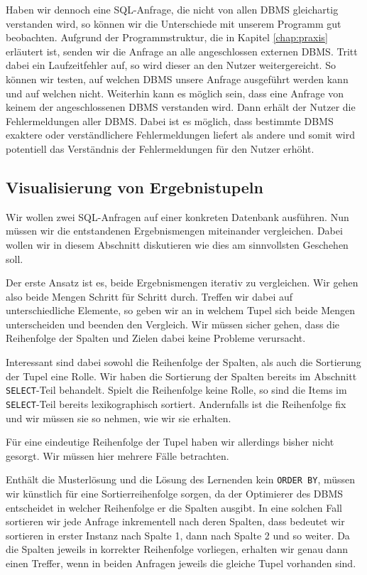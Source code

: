 Haben wir dennoch eine SQL-Anfrage, die nicht von allen DBMS gleichartig verstanden wird, so können wir die Unterschiede mit unserem Programm gut beobachten. Aufgrund der Programmstruktur, die in Kapitel \ref{chap:praxis} erläutert ist, senden wir die Anfrage an alle angeschlossen externen DBMS. Tritt dabei ein Laufzeitfehler auf, so wird dieser an den Nutzer weitergereicht. So können wir testen, auf welchen DBMS unsere Anfrage ausgeführt werden kann und auf welchen nicht. Weiterhin kann es möglich sein, dass eine Anfrage von keinem der angeschlossenen DBMS verstanden wird. Dann erhält der Nutzer die Fehlermeldungen aller DBMS. Dabei ist es möglich, dass bestimmte DBMS exaktere oder verständlichere Fehlermeldungen liefert als andere und somit wird potentiell das Verständnis der Fehlermeldungen für den Nutzer erhöht.

\subsection{Visualisierung von Ergebnistupeln}

Wir wollen zwei SQL-Anfragen auf einer konkreten Datenbank ausführen. Nun müssen wir die entstandenen Ergebnismengen miteinander vergleichen. Dabei wollen wir in diesem Abschnitt diskutieren wie dies am sinnvollsten Geschehen soll. 

Der erste Ansatz ist es, beide Ergebnismengen iterativ zu vergleichen. Wir gehen also beide Mengen Schritt für Schritt durch. Treffen wir dabei auf unterschiedliche Elemente, so geben wir an in welchem Tupel sich beide Mengen unterscheiden und beenden den Vergleich. Wir müssen sicher gehen, dass die Reihenfolge der Spalten und Zielen dabei keine Probleme verursacht.

Interessant sind dabei sowohl die Reihenfolge der Spalten, als auch die Sortierung der Tupel eine Rolle. Wir haben die Sortierung der Spalten bereits im Abschnitt \verb|SELECT|-Teil behandelt. Spielt die Reihenfolge keine Rolle, so sind die Items im \verb|SELECT|-Teil bereits lexikographisch sortiert. Andernfalls ist die Reihenfolge fix und wir müssen sie so nehmen, wie wir sie erhalten.

Für eine eindeutige Reihenfolge der Tupel haben wir allerdings bisher nicht gesorgt. Wir müssen hier mehrere Fälle betrachten. 

Enthält die Musterlösung und die Lösung des Lernenden kein \verb|ORDER BY|, müssen wir künstlich für eine Sortierreihenfolge sorgen, da der Optimierer des DBMS entscheidet in welcher Reihenfolge er die Spalten ausgibt. In eine solchen Fall sortieren wir jede Anfrage inkrementell nach deren Spalten, dass bedeutet wir sortieren in erster Instanz nach Spalte 1, dann nach Spalte 2 und so weiter. Da die Spalten jeweils in korrekter Reihenfolge vorliegen, erhalten wir genau dann einen Treffer, wenn in beiden Anfragen jeweils die gleiche Tupel vorhanden sind.

